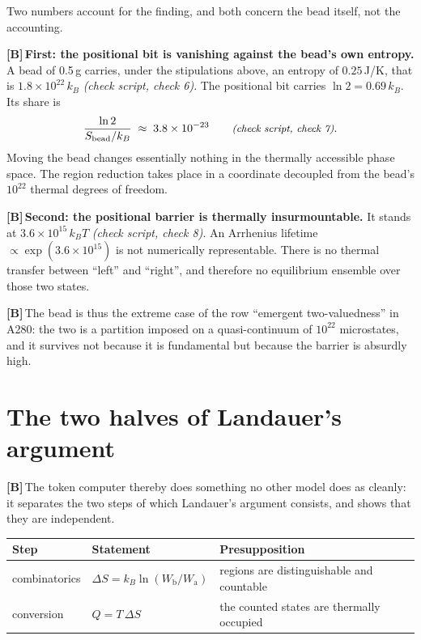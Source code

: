\documentclass[11pt,a4paper]{article}
\newcommand{\LB}{\textcolor{layB}{\textbf{\footnotesize\textsf{[B]}}}\,}
\newcommand{\pruef}[1]{{\small\itshape(check script, #1)}}
\begin{document}
Two numbers account for the finding, and both concern the bead itself, not the
accounting.

\LB \textbf{First: the positional bit is vanishing against the bead's own
entropy.} A bead of 0.5\,g carries, under the stipulations above, an entropy of
$0.25$\,J/K, that is $1.8\times10^{22}\,k_B$ \pruef{check 6}. The positional bit
carries $\ln 2 = 0.69\,k_B$. Its share is
\begin{equation}
  \frac{\ln 2}{S_{\text{bead}}/k_B} \;\approx\; 3.8\times10^{-23}
  \qquad \text{\pruef{check 7}} .
\end{equation}
Moving the bead changes essentially nothing in the thermally accessible phase
space. The region reduction takes place in a coordinate decoupled from the bead's
$10^{22}$ thermal degrees of freedom.

\LB \textbf{Second: the positional barrier is thermally insurmountable.} It stands
at $3.6\times10^{15}\,k_BT$ \pruef{check 8}. An Arrhenius lifetime
$\propto \exp(3.6\times10^{15})$ is not numerically representable. There is no
thermal transfer between “left” and “right”, and therefore no equilibrium ensemble
over those two states.

\LB The bead is thus the extreme case of the row “emergent two-valuedness” in
A280: the two is a partition imposed on a quasi-continuum of $10^{22}$
microstates, and it survives not because it is fundamental but because the barrier
is absurdly high.

\section{The two halves of Landauer's argument}
\label{sec:twohalves}

\LB The token computer thereby does something no other model does as cleanly: it
separates the two steps of which Landauer's argument consists, and shows that they
are independent.

\begin{center}
\small
\begin{tabular}{@{}p{}p{}p{}@{}}
\toprule
\textbf{Step} & \textbf{Statement} & \textbf{Presupposition} \\
\midrule
combinatorics & $\Delta S = k_B \ln(W_{\text{b}}/W_{\text{a}})$ &
regions are distinguishable and countable \\
conversion & $Q = T\,\Delta S$ &
the counted states are thermally occupied \\
\bottomrule
\end{tabular}
\end{center}
\end{document}
